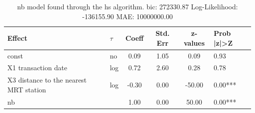 \begin{table}
	\caption{nb model found through the hs algorithm. bic: 272330.87 Log-Likelihood: -136155.90 MAE: 10000000.00}
	\begin{center}
		\begin{tabular}{|l|l|c|c|c|l|}
			\hline
			Effect & $\tau$ & Coeff & Std. Err & z-values & Prob |z|>Z \\
			\hline
			const & no & 0.09 & 1.05 & 0.09 & 0.93 \\
			\hline
			X1 transaction date & log & 0.72 & 2.60 & 0.28 & 0.78 \\
			\hline
			X3 distance to the nearest MRT station & log & -0.30 & 0.00 & -50.00 & 0.00*** \\
			\hline
			nb &  & 1.00 & 0.00 & 50.00 & 0.00*** \\
			\hline
		\end{tabular}
	\end{center}
\end{table}